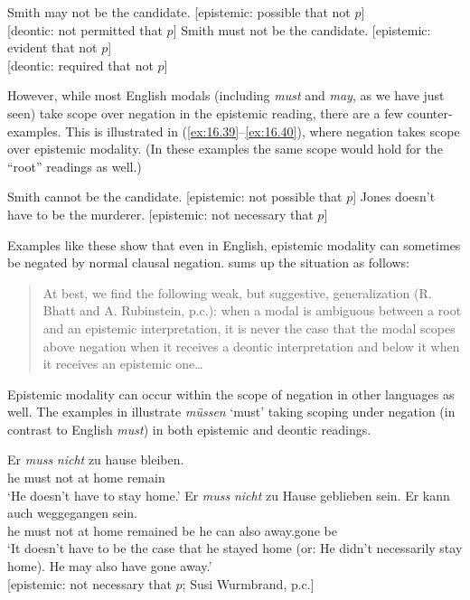 \ea \label{ex:16.37}
Smith may not be the candidate.  \hfill [epistemic: possible that not $p$]\\
                                 \hfill [deontic: not permitted that $p$]
\ex \label{ex:16.38}
Smith must not be the candidate.  \hfill [epistemic: evident that not $p$]\\
                                  \hfill [deontic: required that not $p$]
\z


However, while most English modals (including \textit{must} and \textit{may}, as we have just seen) take scope over negation in the epistemic reading, there are a few counter-examples. This is illustrated in (\ref{ex:16.39}--\ref{ex:16.40}), where negation takes scope over epistemic modality. (In these examples the same scope would hold for the “root” readings as well.)


\ea \label{ex:16.39}
Smith cannot be the candidate. \hfill [epistemic: not possible that $p$]
\ex \label{ex:16.40}
Jones doesn’t have to be the murderer. \hfill [epistemic: not necessary that $p$]
\z


Examples like these show that even in English, epistemic modality can sometimes be negated by normal clausal negation. \citet[sec. 5.3]{Hacquard2011} sums up the situation as follows:


\begin{quote}
At best, we find the following weak, but suggestive, generalization (R. Bhatt and A. Rubinstein, p.c.): when a modal is ambiguous between a root and an epistemic interpretation, it is never the case that the modal scopes above negation when it receives a deontic interpretation and below it when it receives an epistemic one…
\end{quote}


Epistemic modality can occur within the scope of negation in other languages as well. The examples in  illustrate  \textit{müssen} ‘must’ taking scoping under negation (in contrast to English \textit{must}) in both epistemic and deontic readings.


\ea \label{ex:16.41}
\ea   \gll Er  \textit{muss}  \textit{nicht}  zu  hause  bleiben.\\
he  must  not  at  home  remain\\
\glt ‘He doesn’t have to stay home.’
\ex \gll Er  \textit{muss}  \textit{nicht}  zu  Hause  geblieben  sein.  Er  kann  auch  weggegangen  sein.\\
he  must  not  at  home  remained  be  he  can  also  away.gone  be\\
\glt ‘It doesn’t have to be the case that he stayed home (or: He didn’t necessarily stay home). He may also have gone away.’\\
{}[epistemic: not necessary that $p$; Susi Wurmbrand, p.c.]
\z \z


